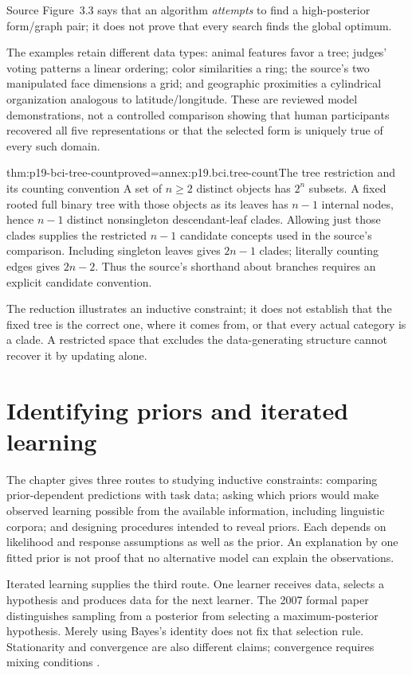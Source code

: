 Source Figure~3.3 says that an algorithm \emph{attempts} to find
a high-posterior form/graph pair; it does not prove that every search finds
the global optimum.

The examples retain different data types: animal features favor a tree;
judges' voting patterns a linear ordering; color similarities a ring;
the source's two manipulated face dimensions a grid; and geographic
proximities a cylindrical organization analogous to latitude/longitude.
These are reviewed model demonstrations, not a controlled comparison
showing that human participants recovered all five representations or
that the selected form is uniquely true of every such domain.

\begin{hbtheorem}{thm:p19-bci-tree-count}{proved=annex:p19.bci.tree-count}{The tree restriction and its counting convention}
A set of \(n\geq2\) distinct objects has \(2^n\) subsets. A fixed
rooted full binary tree with those objects as its leaves has \(n-1\)
internal nodes, hence \(n-1\) distinct nonsingleton descendant-leaf clades.
Allowing just those clades supplies the restricted \(n-1\) candidate
concepts used in the source's comparison. Including singleton leaves gives
\(2n-1\) clades; literally counting edges gives \(2n-2\). Thus the
source's shorthand about branches requires an explicit candidate convention.
\end{hbtheorem}

The reduction illustrates an inductive constraint; it does not establish
that the fixed tree is the correct one, where it comes from, or that
every actual category is a clade. A restricted space that excludes the
data-generating structure cannot recover it by updating alone.

\section{Identifying priors and iterated learning}
\label{sec:p19-bci-iterated}

The chapter gives three routes to studying inductive constraints: comparing
prior-dependent predictions with task data; asking which priors would make
observed learning possible from the available information, including
linguistic corpora; and designing procedures intended to reveal priors.
Each depends on likelihood and response assumptions as well as the prior.
An explanation by one fitted prior is not proof that no alternative model
can explain the observations.

Iterated learning supplies the third route. One learner receives data,
selects a hypothesis and produces data for the next learner. The 2007
formal paper distinguishes sampling from a posterior from selecting a
maximum-posterior hypothesis. Merely using Bayes's identity does not fix
that selection rule. Stationarity and convergence are also different
claims; convergence requires mixing conditions
\cite[pp.~29--30]{GriffithsTenenbaumKemp2012BayesianInference}
\cite[pp.~444--447,453--457,459--460]{GriffithsKalish2007IteratedAgents}.

